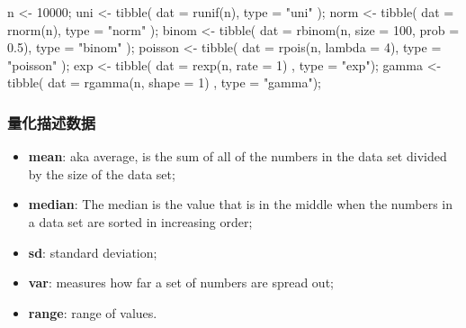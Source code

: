\documentclass[
]{article}
\newenvironment{Shaded}{}{}
\newcommand{\AttributeTok}[1]{\textcolor[rgb]{0.49,0.56,0.16}{#1}}
\newcommand{\DecValTok}[1]{\textcolor[rgb]{0.25,0.63,0.44}{#1}}
\newcommand{\FloatTok}[1]{\textcolor[rgb]{0.25,0.63,0.44}{#1}}
\newcommand{\FunctionTok}[1]{\textcolor[rgb]{0.02,0.16,0.49}{#1}}
\newcommand{\NormalTok}[1]{#1}
\newcommand{\OtherTok}[1]{\textcolor[rgb]{0.00,0.44,0.13}{#1}}
\newcommand{\StringTok}[1]{\textcolor[rgb]{0.25,0.44,0.63}{#1}}
\begin{document}
\begin{Shaded}
\begin{Highlighting}[]
\NormalTok{n }\OtherTok{\textless{}{-}} \DecValTok{10000}\NormalTok{;}
\NormalTok{uni }\OtherTok{\textless{}{-}} \FunctionTok{tibble}\NormalTok{( }\AttributeTok{dat =} \FunctionTok{runif}\NormalTok{(n), }\AttributeTok{type =} \StringTok{"uni"}\NormalTok{ );}
\NormalTok{norm }\OtherTok{\textless{}{-}} \FunctionTok{tibble}\NormalTok{( }\AttributeTok{dat =} \FunctionTok{rnorm}\NormalTok{(n), }\AttributeTok{type =} \StringTok{"norm"}\NormalTok{ );}
\NormalTok{binom }\OtherTok{\textless{}{-}} \FunctionTok{tibble}\NormalTok{( }\AttributeTok{dat =} \FunctionTok{rbinom}\NormalTok{(n, }\AttributeTok{size =} \DecValTok{100}\NormalTok{, }\AttributeTok{prob =} \FloatTok{0.5}\NormalTok{), }\AttributeTok{type =} \StringTok{"binom"}\NormalTok{ );}
\NormalTok{poisson }\OtherTok{\textless{}{-}} \FunctionTok{tibble}\NormalTok{( }\AttributeTok{dat =} \FunctionTok{rpois}\NormalTok{(n, }\AttributeTok{lambda =} \DecValTok{4}\NormalTok{), }\AttributeTok{type =} \StringTok{"poisson"}\NormalTok{ );}
\NormalTok{exp }\OtherTok{\textless{}{-}} \FunctionTok{tibble}\NormalTok{( }\AttributeTok{dat =} \FunctionTok{rexp}\NormalTok{(n, }\AttributeTok{rate =} \DecValTok{1}\NormalTok{) , }\AttributeTok{type =} \StringTok{"exp"}\NormalTok{);}
\NormalTok{gamma }\OtherTok{\textless{}{-}} \FunctionTok{tibble}\NormalTok{( }\AttributeTok{dat =} \FunctionTok{rgamma}\NormalTok{(n, }\AttributeTok{shape =} \DecValTok{1}\NormalTok{) , }\AttributeTok{type =} \StringTok{"gamma"}\NormalTok{);}
\end{Highlighting}
\end{Shaded}

\hypertarget{ux91cfux5316ux63cfux8ff0ux6570ux636e}{%
\subsubsection{量化描述数据}\label{ux91cfux5316ux63cfux8ff0ux6570ux636e}}

\begin{itemize}
\item
  \textbf{mean}: aka average, is the sum of all of the numbers in the
  data set divided by the size of the data set;
\item
  \textbf{median}: The median is the value that is in the middle when
  the numbers in a data set are sorted in increasing order;
\item
  \textbf{sd}: standard deviation;
\item
  \textbf{var}: measures how far a set of numbers are spread out;
\item
  \textbf{range}: range of values.
\end{itemize}
\end{document}
